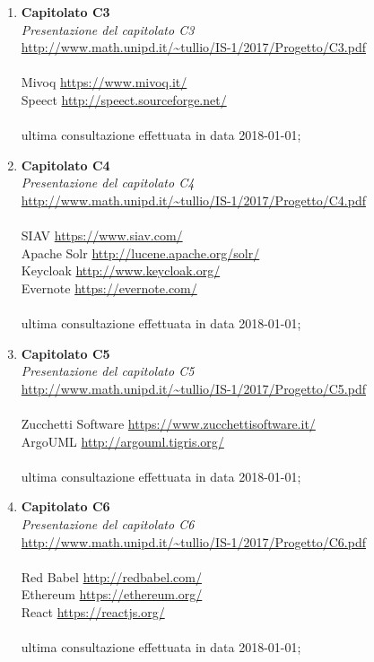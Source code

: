 \begin{enumerate}
\item 
	\textbf{Capitolato C3}\\
	\textit{Presentazione del capitolato C3}\\
	\url{http://www.math.unipd.it/~tullio/IS-1/2017/Progetto/C3.pdf}\\
	\\
	Mivoq \url{https://www.mivoq.it/}\\
	Speect \url{http://speect.sourceforge.net/}\\
	\\
	ultima consultazione effettuata in data 2018-01-01;\\
	
\item 
	\textbf{Capitolato C4}\\
	\textit{Presentazione del capitolato C4}\\
	\url{http://www.math.unipd.it/~tullio/IS-1/2017/Progetto/C4.pdf}\\
	\\
	SIAV \url{https://www.siav.com/}\\
	Apache Solr \url{http://lucene.apache.org/solr/}\\
	Keycloak \url{http://www.keycloak.org/}\\
	Evernote \url{https://evernote.com/}\\
	\\
	ultima consultazione effettuata in data 2018-01-01;\\
	
\item 
	\textbf{Capitolato C5}\\
	\textit{Presentazione del capitolato C5}\\
	\url{http://www.math.unipd.it/~tullio/IS-1/2017/Progetto/C5.pdf}\\
	\\
	Zucchetti Software \url{https://www.zucchettisoftware.it/}\\
	ArgoUML \url{http://argouml.tigris.org/}\\
	\\
	ultima consultazione effettuata in data 2018-01-01;\\
	
\item 
	\textbf{Capitolato C6}\\
	\textit{Presentazione del capitolato C6}\\
	\url{http://www.math.unipd.it/~tullio/IS-1/2017/Progetto/C6.pdf}\\
	\\
	Red Babel \url{http://redbabel.com/}\\
	Ethereum \url{https://ethereum.org/}\\
	React \url{https://reactjs.org/}\\
	\\
	ultima consultazione effettuata in data 2018-01-01;\\
	

\end{enumerate}
